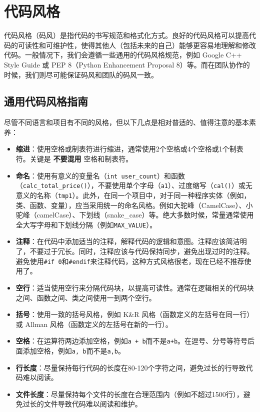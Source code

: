 \section{代码风格}\label{sec:code-style}

代码风格（码风）是指代码的书写规范和格式化方式。良好的代码风格可以提高代码的可读性和可维护性，使得其他人（包括未来的自己）能够更容易地理解和修改代码。一般情况下，我们会遵循一些通用的代码风格规范，例如 Google C++ Style Guide 或 PEP 8（Python Enhancement Proposal 8）等。而在团队协作的时候，我们则尽可能保证码风和团队的码风一致。

\subsection{通用代码风格指南}

尽管不同语言和项目有不同的风格，但以下几点是相对普适的、值得注意的基本素养：
\begin{itemize}
  \item \textbf{缩进}：使用空格或制表符进行缩进，通常使用2个空格或4个空格或1个制表符。关键是 \textbf{不要混用} 空格和制表符。
  \item \textbf{命名}：使用有意义的变量名（\texttt{int user\_count}）和函数（\texttt{calc\_total\_price()}），不要使用单个字母（\texttt{a1}）、过度缩写（\texttt{cal()}）或无意义的名称（\texttt{tmp1}）。此外，在同一个项目中，对于同一种程序实体（例如，类、函数、变量），应当采用统一的命名风格。例如大驼峰（CamelCase）、小驼峰（camelCase）、下划线（snake\_case）等。绝大多数时候，常量通常使用全大写字母和下划线分隔（例如\texttt{MAX\_VALUE}）。
  \item \textbf{注释}：在代码中添加适当的注释，解释代码的逻辑和意图。注释应该简洁明了，不要过于冗长。同时，注释应该与代码保持同步，避免出现过时的注释。避免使用\texttt{\#if 0}和\texttt{\#endif}来注释代码，这种方式风格很老，现在已经不推荐使用了。
  \item \textbf{空行}：适当使用空行来分隔代码块，以提高可读性。通常在逻辑相关的代码块之间、函数之间、类之间使用一到两个空行。
  \item \textbf{括号}：使用一致的括号风格，例如 K\&R 风格（函数定义的左括号在同一行）或 Allman 风格（函数定义的左括号在新的一行）。
  \item \textbf{空格}：在运算符两边添加空格，例如\texttt{a + b}而不是\texttt{a+b}。在逗号、分号等符号后面添加空格，例如\texttt{a, b}而不是\texttt{a,b}。
  \item \textbf{行长度}：尽量保持每行代码的长度在80-120个字符之间，避免过长的行导致代码难以阅读。
  \item \textbf{文件长度}：尽量保持每个文件的长度在合理范围内（例如不超过1500行），避免过长的文件导致代码难以阅读和维护。
\end{itemize}

